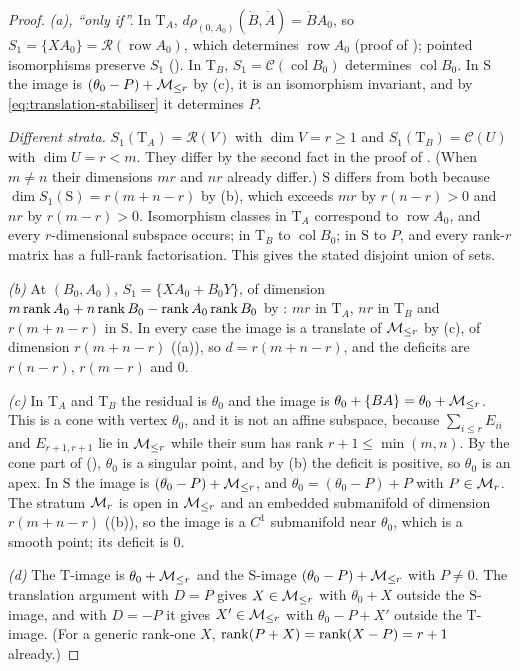 \begin{proof}
\emph{(a), ``only if''.} In $\mathrm T_A$, $d\rho_{(0,A_0)}(\dot B,\dot A)=\dot BA_0$, so
$S_1=\{XA_0\}=\mathcal R(\operatorname{row}A_0)$, which determines $\operatorname{row}A_0$ (proof of
); pointed isomorphisms preserve $S_1$ (). In $\mathrm T_B$,
$S_1=\mathcal C(\operatorname{col}B_0)$ determines $\operatorname{col}B_0$. In $\mathrm S$ the image is
$(\theta_0-P)+\mathcal{M}_{\le r}$ by (c), it is an isomorphism invariant, and by \eqref{eq:translation-stabiliser} it determines $P$.

\emph{Different strata.} $S_1(\mathrm T_A)=\mathcal R(V)$ with $\dim V=r\ge1$ and $S_1(\mathrm T_B)=\mathcal C(U)$ with
$\dim U=r<m$. They differ by the second fact in the proof of . (When $m\ne n$ their dimensions $mr$
and $nr$ already differ.) $\mathrm S$ differs from both because $\dim S_1(\mathrm S)=r(m+n-r)$ by (b), which exceeds $mr$
by $r(n-r)>0$ and $nr$ by $r(m-r)>0$. Isomorphism classes in $\mathrm T_A$ correspond to $\operatorname{row}A_0$, and every
$r$-dimensional subspace occurs; in $\mathrm T_B$ to $\operatorname{col}B_0$; in $\mathrm S$ to $P$, and every rank-$r$
matrix has a full-rank factorisation. This gives the stated disjoint union of sets.

\emph{(b)} At $(B_0,A_0)$, $S_1=\{XA_0+B_0Y\}$, of dimension $m\operatorname{rank} A_0+n\operatorname{rank} B_0-\operatorname{rank} A_0\operatorname{rank} B_0$ by
: $mr$ in $\mathrm T_A$, $nr$ in $\mathrm T_B$ and $r(m+n-r)$ in $\mathrm S$. In every case the
image is a translate of $\mathcal{M}_{\le r}$ by (c), of dimension $r(m+n-r)$ ((a)), so $d=r(m+n-r)$, and the deficits are
$r(n-r)$, $r(m-r)$ and $0$.

\emph{(c)} In $\mathrm T_A$ and $\mathrm T_B$ the residual is $\theta_0$ and the image is $\theta_0+\{BA\}=\theta_0+\mathcal{M}_{\le r}$.
This is a cone with vertex $\theta_0$, and it is not an affine subspace, because $\sum_{i\le r}E_{ii}$ and
$E_{r+1,r+1}$ lie in $\mathcal{M}_{\le r}$ while their sum has rank $r+1\le\min(m,n)$. By the cone part of 
(), $\theta_0$ is a singular point, and by (b) the deficit is positive, so $\theta_0$ is an apex. In
$\mathrm S$ the image is $(\theta_0-P)+\mathcal{M}_{\le r}$, and $\theta_0=(\theta_0-P)+P$ with $P\in\mathcal{M}_r$. The stratum $\mathcal{M}_r$ is open in
$\mathcal{M}_{\le r}$ and an embedded submanifold of dimension $r(m+n-r)$ ((b)), so the image is a $C^1$ submanifold near
$\theta_0$, which is a smooth point; its deficit is $0$.

\emph{(d)} The $\mathrm T$-image is $\theta_0+\mathcal{M}_{\le r}$ and the $\mathrm S$-image $(\theta_0-P)+\mathcal{M}_{\le r}$ with $P\ne0$. The
translation argument with $D=P$ gives $X\in\mathcal{M}_{\le r}$ with $\theta_0+X$ outside the $\mathrm S$-image, and with $D=-P$ it gives
$X'\in\mathcal{M}_{\le r}$ with $\theta_0-P+X'$ outside the $\mathrm T$-image. (For a generic rank-one $X$, $\operatorname{rank}(P+X)=\operatorname{rank}(X-P)=r+1$
already.)


\end{proof}
